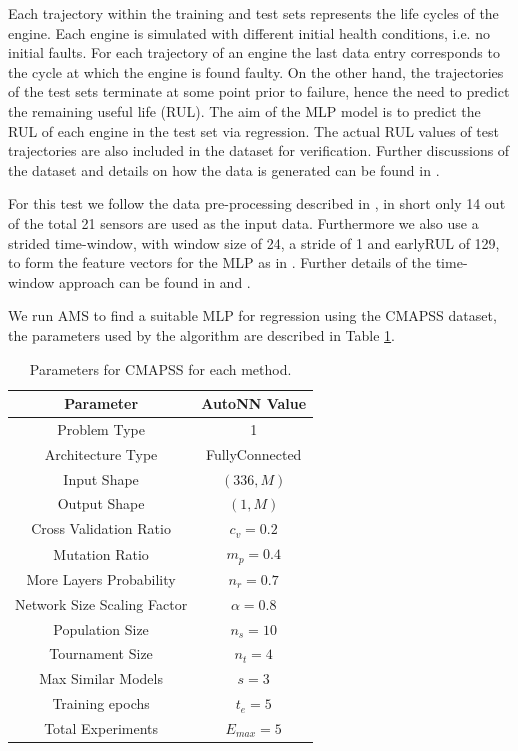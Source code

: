 \documentclass[journal]{IEEEtran}
\begin{document}
Each trajectory within the training and test sets represents the life cycles of the engine. Each engine is simulated with different initial health conditions, i.e. no initial faults. For each trajectory of an engine the last data entry corresponds to the cycle at which the engine is found faulty. On the other hand, the trajectories of the test sets terminate at some point prior to failure, hence the need to predict the remaining useful life (RUL). The aim of the MLP model is to predict the RUL of each engine in the test set via regression. The actual RUL values of test trajectories are also included in the dataset for verification. Further discussions of the dataset and details on how the data is generated can be found in \cite{Saxena2008}.

For this test we follow the data pre-processing described in \cite{Laredo2018}, in short only 14 out of the total 21 sensors are used as the input data. Furthermore we also use a strided time-window, with window size of 24, a stride of 1 and earlyRUL of 129, to form the feature vectors for the MLP as in \cite{Laredo2018}. Further details of the time-window approach can be found in \cite{Laredo2018} and \cite{Li2018}.

We run AMS to find a suitable MLP for regression using the CMAPSS dataset, the parameters used by the algorithm are described in Table \ref{table:CMAPSS_params}.

\begin{table}[!htb]
\begin{center}
\begin{tabular}{| c | c |}
\hline
Parameter & AutoNN Value \\
\hline
Problem Type & 1 \\
Architecture Type & FullyConnected \\
Input Shape & $(336, M)$  \\
Output Shape & $(1, M)$ \\
Cross Validation Ratio & $c_v = 0.2$ \\
Mutation Ratio & $m_p = 0.4$ \\
More Layers Probability & $n_r = 0.7$ \\
Network Size Scaling Factor & $\alpha = 0.8$ \\
Population Size & $n_s = 10$ \\
Tournament Size & $n_t = 4$ \\
Max Similar Models & $s = 3$ \\
Training epochs & $t_e = 5$\\
Total Experiments & $E_{max} = 5$ \\
\hline
\end{tabular}
\end{center}
\caption{Parameters for CMAPSS for each method.}
\label{table:CMAPSS_params}
\end{table}
\end{document}

